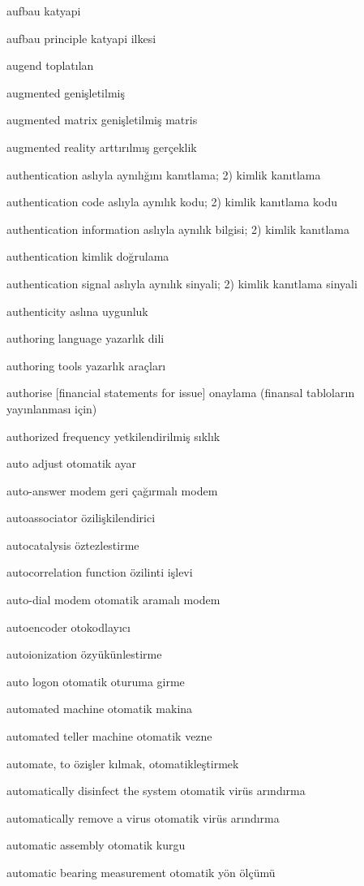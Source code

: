 \documentclass[12pt,fleqn]{article}\usepackage{../../common}
\begin{document}
aufbau katyapi

aufbau principle katyapi ilkesi

augend toplatılan

augmented genişletilmiş

augmented matrix genişletilmiş matris

augmented reality arttırılmış gerçeklik

authentication aslıyla aynılığını kanıtlama; 2) kimlik kanıtlama

authentication code aslıyla aynılık kodu; 2) kimlik kanıtlama kodu

authentication information aslıyla aynılık bilgisi; 2) kimlik kanıtlama

authentication kimlik doğrulama

authentication signal aslıyla aynılık sinyali; 2) kimlik kanıtlama sinyali

authenticity aslına uygunluk

authoring language yazarlık dili

authoring tools yazarlık araçları

authorise [financial statements for issue] onaylama (finansal tabloların yayınlanması için)

authorized frequency yetkilendirilmiş sıklık

auto adjust otomatik ayar

auto-answer modem geri çağırmalı modem

autoassociator özilişkilendirici

autocatalysis öztezlestirme

autocorrelation function özilinti işlevi

auto-dial modem otomatik aramalı modem

autoencoder otokodlayıcı

autoionization özyükünlestirme

auto logon otomatik oturuma girme

automated machine otomatik makina

automated teller machine otomatik vezne

automate, to özişler kılmak, otomatikleştirmek

automatically disinfect the system otomatik virüs arındırma

automatically remove a virus otomatik virüs arındırma

automatic assembly otomatik kurgu

automatic bearing measurement otomatik yön ölçümü
\end{document}
